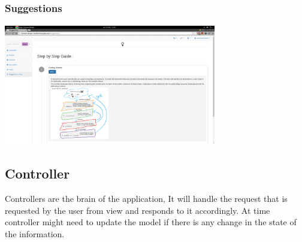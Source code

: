 \subsubsection{Suggestions}

\begin{center}
\includegraphics[height=200px, width=350px]{./img/dsgn_img/suggestions.png}
	
\end{center}





\subsection{Controller}

Controllers are the brain of the application, It will handle the request that is requested by the user from view and responds to it accordingly. At time controller might need to update the model if there is any change in the state of the information.